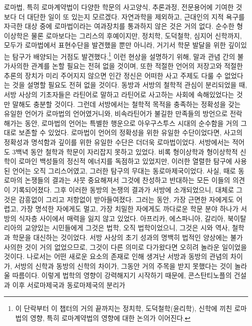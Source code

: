 로마법, 특히 로마계약법이
다양한 학문의
사고양식, 추론과정, 전문용어에 기여한 것보다
더 대단한 일이 또 있는지 모르겠다.
자연과학을 제외하고,
근대인의 지적 욕구를 자극한 대상 중에
로마법이라는 여과장치를 통과하지 않은 것은 거의 없다.
순수한 형이상학은 물론 로마보다는 그리스의 후예이지만,
정치학, 도덕철학, 심지어 신학까지,
모두가 로마법에서 표현수단을 발견했을 뿐만 아니라,
거기서 학문 발달을 위한 깊이있는 탐구가 배양되는 거점도 발견했다.\footnote{%
  이 단락부터 이 챕터의 거의 끝까지는
  정치학, 도덕철학(윤리학), 신학에 끼친
  로마법의 영향, 특히 로마계약법의 영향에 대한 논의가 이어진다.
  }
이런 현상을 설명하기 위해,
말과 관념 간의 불가사의한 관계를 논할 필요는 전혀 없을 것이며,
또한
적절한 언어의 저장고와 적절한 추론의 장치가 미리 주어지지 않으면
인간 정신은 어떠한 사고 주제도 다룰 수 없었다는 것을 설명할
필요도 전혀 없을 것이다.
동방과 서방의 철학적 관심이 분리되었을 때,
서방 사상의 기초자들은 라틴어로 말하고 라틴어로 사고하는 사회에
속해있었다는 것만 말해도 충분할 것이다.
그런데
서방에서는
철학적 목적을 충족하는 정확성을 갖는 유일한 언어가
로마법의 언어였거니와,
비속라틴어가 불길한 만족들의 방언으로 전락해가는 동안,
로마법의 언어는 특별한 행운으로
아우구스투스 시대의 순수함을 거의 그대로 보존할 수 있었다.
로마법이 언어의 정확성을 위한 유일한 수단이었다면,
사고의 정확성과 명석함과 깊이를 위한 유일한 수단은 더더욱 로마법이었다.
서방에서는
적어도 3백녁 동안 철학과 학문이 자리잡지 못하고 있었다.
비록 형이상학과 형이상학적 신학이 로마인 백성들의 정신적 에너지를
독점하고 있었지만,
이러한 열렬한 탐구에 사용된 언어는 오직 그리스어였고,
그러한 탐구의 무대는 동로마제국이었다.
사실,
때로 동로마의 논쟁들의 결과는 사뭇 중요해져서
그것에 찬성하고 반대하는 모든 이들의 의견이 기록되어졌다.
그후 이러한 동방의 논쟁의 결과가 서방에 소개되었으니,
대체로 그것은
감흥없이 그리고 저항없이 받아들여졌다.
그러는 동안,
가장 근면한 자에게도 어렵고,
가장 명석한 자에게도 멀고,
가장 치밀한 자에게도 까다로운
학문 분야 하나가 서방의 식자층 사이에서
매력을 잃지 않고 있었다.
아프리카, 에스파니아, 갈리아, 북이탈리아의 교양있는 시민들에게
그것은 법학, 오직 법학이었으니,
그것은 시와 역사, 철학과 학문을 대신하는 것이었다.
서방 사상의 초기 성과의 명백히 법적인 양상에는
불가사의한 것이 거의 없었으므로,
그것이 다른 의미로 다가왔다면 오히려 놀라운 일이었을 것이다.
나로서는
어떤 새로운 요소의 존재로 인해 생겨난
서방과 동방의 관념의 차이가,
서방의 신학과 동방의 신학의 차이가,
그동안 거의 주목을 받지 못했다는 것이
놀라울 따름이다.
이렇게 법학의 영향이 강력해지기 시작하기 때문에,
콘스탄티노플의 건설과 이후 서로마제국과 동로마제국의 분리가

